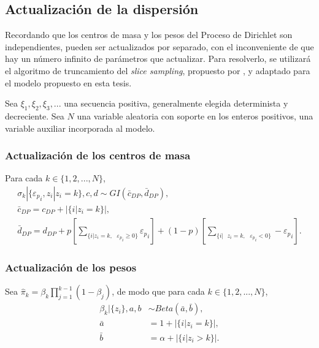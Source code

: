 \subsection{Actualizaci\'on de la dispersi\'on}

Recordando que los centros de masa y los pesos del Proceso de Dirichlet son independientes, pueden ser actualizados por separado, con el inconveniente de que hay un n\'umero infinito de par\'ametros que actualizar. Para resolverlo, se utilizará el algoritmo de truncamiento del \textit{slice sampling}, propuesto por \cite{Kalli_Slice}, y adaptado para el modelo propuesto en esta tesis.

Sea $\xi_1,\xi_2,\xi_3,...$ una secuencia positiva, generalmente elegida determinista y decreciente. Sea $N$ una variable aleatoria con soporte en los enteros positivos, una variable auxiliar incorporada al modelo.

\subsubsection{Actualizaci\'on de los centros de masa}

Para cada $k \in \{1,2,...,N\}$,
\begin{equation*}
\begin{gathered}
    \sigma_k | \{{\varepsilon_p}_i, z_i | z_i = k\}, c, d \sim GI(\bar{c}_{DP}, \bar{d}_{DP}),\\
    \bar{c}_{DP} = c_{DP} + |\{i| z_i = k\}|, \\
    \bar{d}_{DP} = d_{DP} 
    + p \left[\sum_{\{i| z_i = k,\text{ }{\varepsilon_p}_i \geq 0\}} {\varepsilon_p}_i\right]
    + (1-p) \left[\sum_{\{i| \text{ } z_i = k,\text{ }{\varepsilon_p}_i < 0\}}  -{\varepsilon_p}_i\right].
\end{gathered}
\end{equation*}

\subsubsection{Actualizaci\'on de los pesos}

Sea $\hat{\pi}_k = \beta_k \prod_{j=1}^{k-1}(1 - \beta_j)$, de modo que para cada $k \in \{1,2,...,N\}$,
\begin{equation*}
\begin{aligned}
    \beta_k|\{z_i\}, a,b &\sim Beta(\bar{a}, \bar{b}), \\
    \bar{a} &= 1 + |\{i|z_i = k\}|, \\
    \bar{b} &= \alpha + |\{i|z_i > k\}|.
\end{aligned}
\end{equation*}

